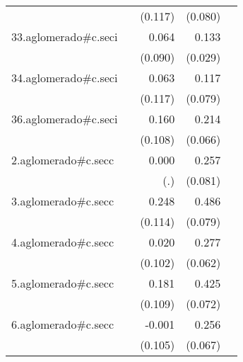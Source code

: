 {\begin{longtable}{l*{4}{D{.}{.}{-1}}}
            &                     &     (0.117)         &     (0.080)         &                     \\
\addlinespace
33.aglomerado#c.seci&                     &       0.064         &       0.133\sym{***}&                     \\
            &                     &     (0.090)         &     (0.029)         &                     \\
\addlinespace
34.aglomerado#c.seci&                     &       0.063         &       0.117         &                     \\
            &                     &     (0.117)         &     (0.079)         &                     \\
\addlinespace
36.aglomerado#c.seci&                     &       0.160         &       0.214\sym{**} &                     \\
            &                     &     (0.108)         &     (0.066)         &                     \\
\addlinespace
2.aglomerado#c.secc&                     &       0.000         &       0.257\sym{**} &                     \\
            &                     &         (.)         &     (0.081)         &                     \\
\addlinespace
3.aglomerado#c.secc&                     &       0.248\sym{*}  &       0.486\sym{***}&                     \\
            &                     &     (0.114)         &     (0.079)         &                     \\
\addlinespace
4.aglomerado#c.secc&                     &       0.020         &       0.277\sym{***}&                     \\
            &                     &     (0.102)         &     (0.062)         &                     \\
\addlinespace
5.aglomerado#c.secc&                     &       0.181         &       0.425\sym{***}&                     \\
            &                     &     (0.109)         &     (0.072)         &                     \\
\addlinespace
6.aglomerado#c.secc&                     &      -0.001         &       0.256\sym{***}&                     \\
            &                     &     (0.105)         &     (0.067)         &                     \\

\end{longtable}}
